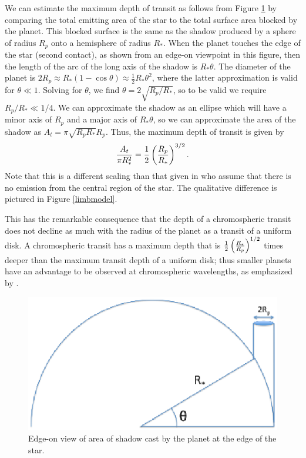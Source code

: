 \documentclass[manuscript]{aastex}
\newcommand{\oi}{\ensuremath{\mathrm{O}\,\scriptstyle \mathrm{I}}}
\begin{document}
We can estimate the maximum depth of transit as follows from
Figure \ref{fig01} by comparing the total emitting area of the star to the total surface area blocked by the planet. This blocked surface is the same as the shadow produced by a sphere of radius $R_p$ onto a hemisphere of radius $R_*$. When the planet touches the edge of the star 
(second contact), as shown from an edge-on viewpoint in this figure,
then the length of the arc of the long axis of the shadow is
$R_*\theta$.  The diameter of the planet is 
$2 R_p \approx R_*(1-\cos{\theta}) \approx \frac{1}{2} R_* \theta^2$,
where the latter approximation is valid for $\theta \ll 1$.
Solving for $\theta$, we find $\theta = 2\sqrt{R_p/R_*}$, so to
be valid we require $R_p/R_* \ll 1/4$.  We can approximate
the shadow as an ellipse which will have a minor axis of $R_p$
and a major axis of $R_*\theta$, so we can approximate the
area of the shadow as $A_t = \pi \sqrt{R_pR_*} R_p$.  Thus,
the maximum depth of transit is given by 
\begin{equation} \label{depth_anal}
{A_t \over \pi R_*^2} = \frac{1}{2} \left({R_p \over R_*}\right)^{3/2}.
\end{equation}
Note that this is a different scaling than that given in \citet{assef} who assume that there is no emission from the central region of the star. The qualitative difference is pictured in Figure \ref{limbmodel}.


This has the remarkable consequence that the depth of a chromospheric
transit does not decline as much with the radius of the planet as 
a transit of a uniform disk.  A chromospheric transit has a maximum
depth that is $\frac{1}{2} \left({R_* \over R_p}\right)^{1/2}$
times deeper than the maximum transit depth of a uniform disk;
thus smaller planets have an advantage to be observed at
chromospheric wavelengths, as emphasized by \citet{assef}.

\begin{figure}
\includegraphics[width=0.5 \textwidth]{Chromospheric_shadow.eps}
\caption{Edge-on view of area of shadow cast by the planet
at the edge of the star.}
\label{fig01}
\end{figure}
\end{document}
